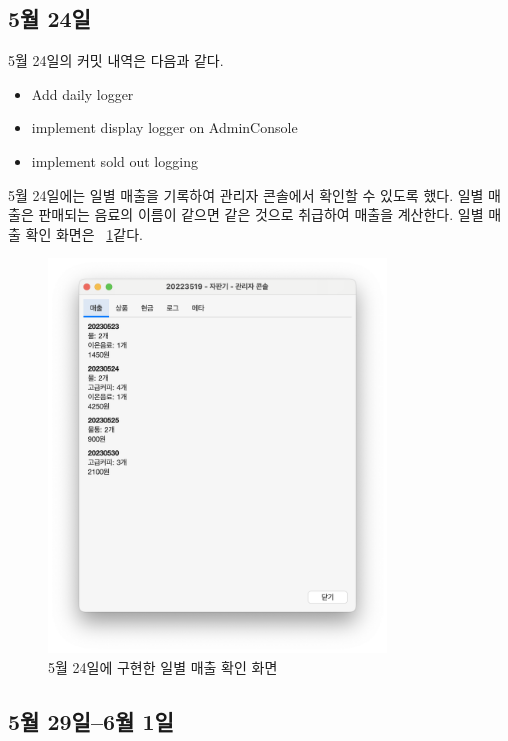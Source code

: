 \documentclass{oblivoir}
\newcommand{\figref}[1]{\figurename~\ref{#1}}
\begin{document}
    \subsection{5월 24일}

    5월 24일의 커밋 내역은 다음과 같다.
    \begin{itemize}
        \item Add daily logger
        \item implement display logger on AdminConsole
        \item implement sold out logging
    \end{itemize}

    5월 24일에는 일별 매출을 기록하여 관리자 콘솔에서 확인할 수 있도록 했다.
    일별 매출은 판매되는 음료의 이름이 같으면 같은 것으로 취급하여 매출을 계산한다.
    일별 매출 확인 화면은 \figref{fig:0524-daily-log}\와 같다.
    \begin{figure}[h]
        \centering
        \includegraphics[width=0.8\textwidth]{0524-daily-log.png}
        \caption{5월 24일에 구현한 일별 매출 확인 화면}
        \label{fig:0524-daily-log}
    \end{figure}

    \subsection{5월 29일--6월 1일}
\end{document}
